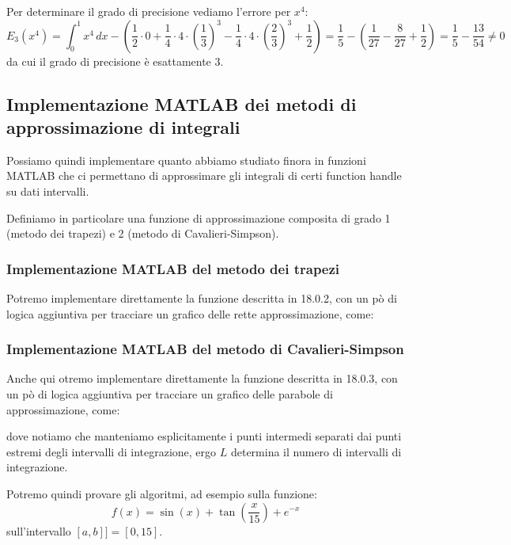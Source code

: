 \documentclass[a4paper,11pt]{article}
\begin{document}
Per determinare il grado di precisione vediamo l'errore per $x^4$:
$$
E_3(x^4) = \int_0^1 x^4 \, dx - \left( \frac{1}{2} \cdot 0 + \frac{1}{4} \cdot 4 \cdot \left( \frac{1}{3} \right)^3 - \frac{1}{4} \cdot 4 \cdot \left( \frac{2}{3} \right)^3 + \frac{1}{2} \right) = \frac{1}{5} - \left( \frac{1}{27} - \frac{8}{27} + \frac{1}{2} \right) = \frac{1}{5} - \frac{13}{54} \neq 0
$$
da cui il grado di precisione è esattamente 3.

\subsection{Implementazione MATLAB dei metodi di approssimazione di integrali}
Possiamo quindi implementare quanto abbiamo studiato finora in funzioni MATLAB che ci permettano di approssimare gli integrali di certi function handle su dati intervalli.

Definiamo in particolare una funzione di approssimazione composita di grado 1 (metodo dei trapezi) e 2 (metodo di Cavalieri-Simpson).

\subsubsection{Implementazione MATLAB del metodo dei trapezi}
Potremo implementare direttamente la funzione descritta in 18.0.2, con un pò di logica aggiuntiva per tracciare un grafico delle rette approssimazione, come:

\lstset{language=MATLAB,style=codestyle}


\subsubsection{Implementazione MATLAB del metodo di Cavalieri-Simpson}
Anche qui otremo implementare direttamente la funzione descritta in 18.0.3, con un pò di logica aggiuntiva per tracciare un grafico delle parabole di approssimazione, come:

\lstset{language=MATLAB,style=codestyle}

dove notiamo che manteniamo esplicitamente i punti intermedi separati dai punti estremi degli intervalli di integrazione, ergo $L$ determina il numero di intervalli di integrazione.

\par\medskip

Potremo quindi provare gli algoritmi, ad esempio sulla funzione:
$$
f(x) = \sin\left(x\right)+\tan\left(\frac{x}{15}\right)+e^{-x} 
$$
sull'intervallo $[a, b]] = [0, 15]$.
\end{document}
